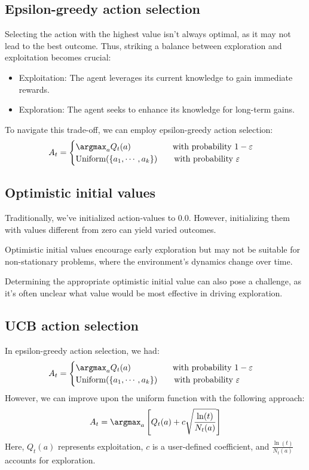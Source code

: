 \subsection{Epsilon-greedy action selection}
Selecting the action with the highest value isn't always optimal, as it may not lead to the best outcome. 
Thus, striking a balance between exploration and exploitation becomes crucial:
\begin{itemize}
    \item Exploitation: The agent leverages its current knowledge to gain immediate rewards.
    \item Exploration: The agent seeks to enhance its knowledge for long-term gains.
\end{itemize}
To navigate this trade-off, we can employ epsilon-greedy action selection:
\[A_t=\begin{cases}
    \argmax_a Q_t(a) \qquad\qquad\quad\text{with probability }1-\varepsilon\\
    \text{Uniform}(\{a_1,\cdots,a_k\})\qquad\text{with probability }\varepsilon
\end{cases}\]

\subsection{Optimistic initial values}
Traditionally, we've initialized action-values to 0.0. 
However, initializing them with values different from zero can yield varied outcomes.

Optimistic initial values encourage early exploration but may not be suitable for non-stationary problems, where the environment's dynamics change over time.

Determining the appropriate optimistic initial value can also pose a challenge, as it's often unclear what value would be most effective in driving exploration.

\subsection{UCB action selection}
In epsilon-greedy action selection, we had:
\[A_t=\begin{cases}
    \argmax_a Q_t(a) \qquad\qquad\quad\text{with probability }1-\varepsilon\\
    \text{Uniform}(\{a_1,\cdots,a_k\})\qquad\text{with probability }\varepsilon
\end{cases}\]
However, we can improve upon the uniform function with the following approach:
\[A_t=\argmax_a\left[Q_t(a)+c\sqrt{\dfrac{\ln(t)}{N_t(a)}}\right]\]
Here, $Q_t(a)$ represents exploitation, $c$ is a user-defined coefficient, and $\frac{\ln(t)}{N_t(a)}$ accounts for exploration.